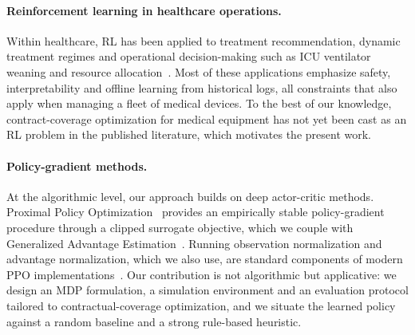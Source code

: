 \paragraph{Reinforcement learning in healthcare operations.}
Within healthcare, RL has been applied to treatment recommendation, dynamic treatment regimes and operational decision-making such as ICU ventilator weaning and resource allocation~\cite{yu2021reinforcement}. Most of these applications emphasize safety, interpretability and offline learning from historical logs, all constraints that also apply when managing a fleet of medical devices. To the best of our knowledge, contract-coverage optimization for medical equipment has not yet been cast as an RL problem in the published literature, which motivates the present work.


\paragraph{Policy-gradient methods.}
At the algorithmic level, our approach builds on deep actor-critic methods. Proximal Policy Optimization~\cite{schulman2017ppo} provides an empirically stable policy-gradient procedure through a clipped surrogate objective, which we couple with Generalized Advantage Estimation~\cite{schulman2016gae}. Running observation normalization and advantage normalization, which we also use, are standard components of modern PPO implementations~\cite{andrychowicz2021matters}. Our contribution is not algorithmic but applicative: we design an MDP formulation, a simulation environment and an evaluation protocol tailored to contractual-coverage optimization, and we situate the learned policy against a random baseline and a strong rule-based heuristic.
